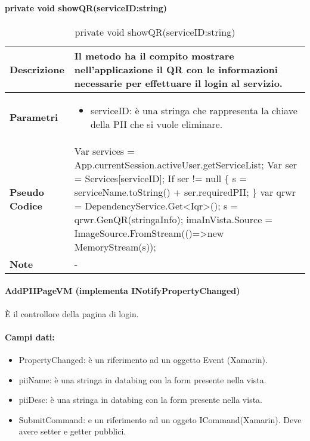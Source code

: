 \paragraph{private void showQR(serviceID:string)}
\begin{center}
    \begin{longtable}{|p{3cm}|p{9cm}|}%
    \caption{private void showQR(serviceID:string)}
    \endfirsthead
    \endhead
    \hline
    \textbf{Descrizione} & Il metodo ha il compito mostrare nell’applicazione il QR con le informazioni necessarie per effettuare il login al servizio.\\
    \hline
    \textbf{Parametri} &      
    \begin{itemize}
        \item serviceID: è una stringa che rappresenta la chiave della PII che si vuole eliminare.
    \end{itemize}
    \\
    \hline
    \textbf{Pseudo Codice} & 
    Var services = App.currentSession.activeUser.getServiceList;\newline
    Var ser = Services[serviceID];\newline
    If ser != null \{\newline
    s = serviceName.toString() + ser.requiredPII;\newline
    \}\newline
    var qrwr = DependencyService.Get<Iqr>();\newline
    s = qrwr.GenQR(stringaInfo);\newline
    imaInVista.Source = ImageSource.FromStream(()=>new MemoryStream(s));\newline
    \\
    \hline
    \textbf{Note} & 
    -
    \\
    \hline
    \end{longtable}
\end{center}




\paragraph{AddPIIPageVM (implementa INotifyPropertyChanged)}
È il controllore della pagina di login.
\paragraph{Campi dati:}
\begin{itemize}
    \item PropertyChanged: è un riferimento ad un oggetto Event (Xamarin).
    \item piiName: è una stringa in databing con la form presente nella vista. 
    \item piiDesc: è una stringa in databing con la form presente nella vista.
    \item SubmitCommand: e un riferimento ad un oggeto ICommand(Xamarin). Deve avere setter e getter pubblici.
\end{itemize}

